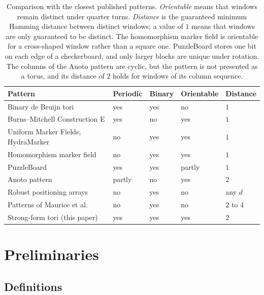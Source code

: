 \documentclass{lipics-v2021}
\begin{document}
\begin{table}[htbp]
\centering
\small
\begin{tabular}{@{}p{5.2cm}llll@{}}
\toprule
Pattern & Periodic & Binary & Orientable & Distance \\
\midrule
Binary de Bruijn tori \cite{fan85debruijn,kreitzer2024alternating,schusselbauer2021dothraki} & yes & yes & no & $1$ \\
Burns--Mitchell Construction E \cite{burns1993coding} & yes & no & yes & $1$ \\
Uniform Marker Fields, HydraMarker \cite{szentandrasi2012uniform,zhu2022hydramarker} & no & yes & yes & $1$ \\
Homomorphism marker field \cite{mao2025homomorphism} & no & yes & yes & $1$ \\
PuzzleBoard \cite{stelldinger2024puzzleboard} & yes & yes & partly & $1$ \\
Anoto pattern \cite{hostettler2016real} & partly & no & yes & $2$ \\
Robust positioning arrays \cite{chee2022robust} & no & yes & no & any $d$ \\
Patterns of Maurice et al.\ \cite{maurice2011pattern} & no & yes & no & $2$ to $4$ \\
Strong-form tori (this paper) & yes & yes & yes & $2$ \\
\bottomrule
\end{tabular}
\caption{Comparison with the closest published patterns.
\emph{Orientable} means that windows remain distinct under quarter turns.
\emph{Distance} is the guaranteed minimum Hamming distance between distinct windows; a value of $1$ means that windows are only guaranteed to be distinct.
The homomorphism marker field is orientable for a cross-shaped window rather than a square one.
PuzzleBoard stores one bit on each edge of a checkerboard, and only larger blocks are unique under rotation.
The columns of the Anoto pattern are cyclic, but the pattern is not presented as a torus, and its distance of $2$ holds for windows of its column sequence.}
\label{tab:related}
\end{table}


\section{Preliminaries}
\label{sec:preliminaries}

\subsection{Definitions}
\label{sec:preliminaries_definitions}
\end{document}

